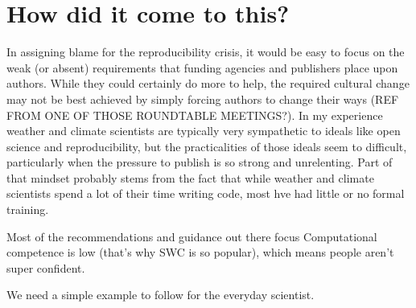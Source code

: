 \section{How did it come to this?}

In assigning blame for the reproducibility crisis, it would be easy to focus on the weak (or absent) requirements that funding agencies and publishers place upon authors. While they could certainly do more to help, the required cultural change may not be best achieved by simply forcing authors to change their ways (REF FROM ONE OF THOSE ROUNDTABLE MEETINGS?). In my experience weather and climate scientists are typically very sympathetic to ideals like open science and reproducibility, but the practicalities of those ideals seem to difficult, particularly when the pressure to publish is so strong and unrelenting. Part of that mindset probably stems from the fact that while weather and climate scientists spend a lot of their time writing code, most hve had little or no formal training. 


Most of the recommendations and guidance out there focus 
Computational competence is low (that's why SWC is so popular), which means people aren't super confident. 

We need a simple example to follow for the everyday scientist.
